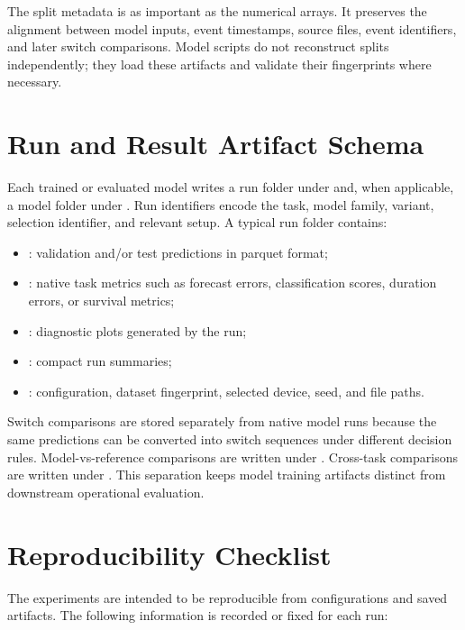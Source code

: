 The split metadata is as important as the numerical arrays. It preserves the
alignment between model inputs, event timestamps, source files, event
identifiers, and later switch comparisons. Model scripts do not reconstruct
splits independently; they load these artifacts and validate their fingerprints
where necessary.

\section{Run and Result Artifact Schema}
\label{app:run-result-artifact-schema}

Each trained or evaluated model writes a run folder under
 and, when applicable, a model folder under
. Run identifiers encode the task, model family,
variant, selection identifier, and relevant setup. A typical run folder
contains:

\begin{itemize}
  \item {}: validation and/or test predictions in parquet
  format;
  \item {}: native task metrics such as forecast errors,
  classification scores, duration errors, or survival metrics;
  \item {}: diagnostic plots generated by the run;
  \item {}: compact run summaries;
  \item {}: configuration, dataset fingerprint, selected
  device, seed, and file paths.
\end{itemize}

Switch comparisons are stored separately from native model runs because the
same predictions can be converted into switch sequences under different
decision rules. Model-vs-reference comparisons are written under
. Cross-task
comparisons are written under
. This separation
keeps model training artifacts distinct from downstream operational
evaluation.

\section{Reproducibility Checklist}
\label{app:reproducibility-checklist}

The experiments are intended to be reproducible from configurations and saved
artifacts. The following information is recorded or fixed for each run:

